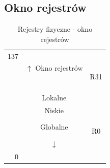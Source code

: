 \documentclass[a4paper,twoside]{article}
\begin{document}
\subsection{Okno rejestrów}
\begin{table}[htbp]
	\centering
	\caption{Rejestry fizyczne - okno rejestrów}
	\begin{tabular}{r|r|r}
		\cline{2-2}    137   & \multirow{6}[2]{*}{$ \uparrow $ Okno rejestrów} &  \bigstrut[t]\\
		&       &  \\
		&       &  \\
		&       &  \bigstrut[b]\\
		\cline{2-2}          & \multicolumn{1}{c|}{\multirow{4}[2]{*}{Wysokie}} & \multicolumn{1}{c}{R31} \bigstrut[t]\\
		& \multicolumn{1}{c|}{} & \multicolumn{1}{c}{} \\
		& \multicolumn{1}{c|}{} & \multicolumn{1}{c}{} \\
		& \multicolumn{1}{c|}{} & \multicolumn{1}{c}{} \bigstrut[b]\\
		\cline{2-2}          & \multicolumn{1}{c|}{\multirow{4}[2]{*}{Lokalne}} & \multicolumn{1}{c}{} \bigstrut[t]\\
		& \multicolumn{1}{c|}{} & \multicolumn{1}{c}{} \\
		& \multicolumn{1}{c|}{} & \multicolumn{1}{c}{} \\
		& \multicolumn{1}{c|}{} & \multicolumn{1}{c}{} \bigstrut[b]\\
		\cline{2-2}          & \multicolumn{1}{c|}{\multirow{4}[2]{*}{Niskie}} & \multicolumn{1}{c}{} \bigstrut[t]\\
		& \multicolumn{1}{c|}{} & \multicolumn{1}{c}{} \\
		& \multicolumn{1}{c|}{} & \multicolumn{1}{c}{} \\
		& \multicolumn{1}{c|}{} & \multicolumn{1}{c}{} \bigstrut[b]\\
		\cline{2-2}          & \multicolumn{1}{c|}{\multirow{4}[2]{*}{Globalne}} & \multicolumn{1}{c}{} \bigstrut[t]\\
		& \multicolumn{1}{c|}{} & \multicolumn{1}{c}{} \\
		& \multicolumn{1}{c|}{} & \multicolumn{1}{c}{} \\
		& \multicolumn{1}{c|}{} & \multicolumn{1}{c}{R0} \bigstrut[b]\\
		\cline{2-2}          & \multicolumn{1}{c|}{\multirow{2}[2]{*}{$ \downarrow $ }} &  \bigstrut[t]\\
		& \multicolumn{1}{c|}{} &  \\
		0     & \multicolumn{1}{c|}{} &  \bigstrut[b]\\
		\cline{2-2}
	\end{tabular}%
	\label{tab:addlabel}%
	\vspace{-2cm}
\end{table}
\end{document}
